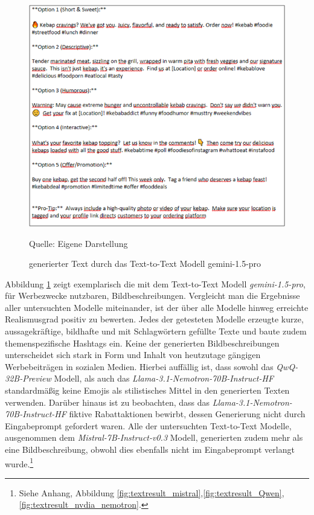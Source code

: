 \begin{figure}[htbp]
    \includegraphics[width=\textwidth, height=\textheight, keepaspectratio]{abbildungen/textresult_gemini}
    \caption{generierter Text durch das Text-to-Text Modell gemini-1.5-pro}
    \label{fig:textresult_gemini}
    \vspace{0.5cm}
    \raggedright Quelle: Eigene Darstellung
\end{figure}
Abbildung \ref{fig:textresult_gemini} zeigt exemplarisch die mit dem Text-to-Text Modell \textit{gemini-1.5-pro}, für Werbezwecke nutzbaren, Bildbeschreibungen.
Vergleicht man die Ergebnisse aller untersuchten Modelle miteinander, ist der über alle Modelle hinweg erreichte Realismusgrad positiv zu bewerten.
Jedes der getesteten Modelle erzeugte kurze, aussagekräftige, bildhafte und mit Schlagwörtern gefüllte Texte und baute zudem themenspezifische Hashtags ein.
Keine der generierten Bildbeschreibungen unterscheidet sich stark in Form und Inhalt von heutzutage gängigen Werbebeiträgen in sozialen Medien.
Hierbei auffällig ist, dass sowohl das \textit{QwQ-32B-Preview} Modell, als auch das \textit{Llama-3.1-Nemotron-70B-Instruct-HF} standardmäßig keine Emojis als stilistisches Mittel in den generierten Texten verwenden.
Darüber hinaus ist zu beobachten, dass das \textit{Llama-3.1-Nemotron-70B-Instruct-HF} fiktive Rabattaktionen bewirbt, dessen Generierung nicht durch Eingabeprompt gefordert waren.
Alle der untersuchten Text-to-Text Modelle, ausgenommen dem \textit{Mistral-7B-Instruct-v0.3} Modell, generierten zudem mehr als eine Bildbeschreibung, obwohl dies ebenfalls nicht im Eingabeprompt verlangt wurde.\footnote{Siehe Anhang, Abbildung \ref{fig:textresult_mistral},\ref{fig:textresult_Qwen},\ref{fig:textresult_nvdia_nemotron}.}

